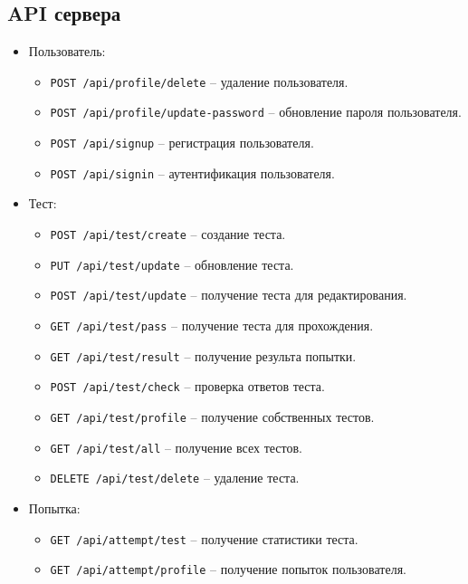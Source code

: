 \subsection{API сервера}
\begin{itemize}
    \item Пользователь: \begin{itemize}
        \item \texttt{POST /api/profile/delete} -- удаление пользователя.
        \item \texttt{POST /api/profile/update-password} -- обновление пароля пользователя.
        \item \texttt{POST /api/signup} -- регистрация пользователя.
        \item \texttt{POST /api/signin} -- аутентификация пользователя.
    \end{itemize}
    \item Тест: \begin{itemize}
        \item \texttt{POST /api/test/create} -- создание теста.
        \item \texttt{PUT /api/test/update} -- обновление теста.
        \item \texttt{POST /api/test/update} -- получение теста для редактирования.
        \item \texttt{GET /api/test/pass} -- получение теста для прохождения.
        \item \texttt{GET /api/test/result} -- получение результа попытки.
        \item \texttt{POST /api/test/check} -- проверка ответов теста.
        \item \texttt{GET /api/test/profile} -- получение собственных тестов.
        \item \texttt{GET /api/test/all} -- получение всех тестов.
        \item \texttt{DELETE /api/test/delete} -- удаление теста.
    \end{itemize}
    \item Попытка: \begin{itemize}
        \item \texttt{GET /api/attempt/test} -- получение статистики теста.
        \item \texttt{GET /api/attempt/profile} -- получение попыток пользователя.
    \end{itemize}
\end{itemize}


